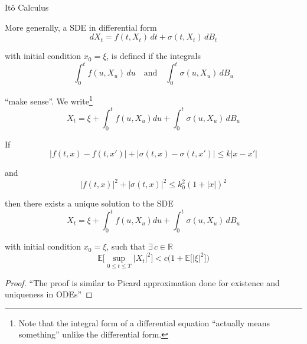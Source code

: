 \documentclass[12pt]{article}
\newenvironment{theorem}[2][Theorem:]{\begin{trivlist} %
\item[\hskip \labelsep {\bfseries #1}\hskip \labelsep {\bfseries #2.}]}{\end{trivlist}}
\begin{document}
\begin{section}{It\^{o} Calculus}
\begin{theorem}{Existence}
More generally, a SDE in differential form
\begin{equation*}
	dX_t = f(t,X_t)\,dt + \sigma(t,X_t)\,dB_t
\end{equation*}

with initial condition $x_0 = \xi$, is defined if the integrals
\begin{equation*}
	\int^t_0f(u,X_u)\,du \quad \text{and} \quad \int^t_0 \sigma(u,X_u)\,dB_u
\end{equation*}

``make sense''. We write\footnote{Note that the integral form of a differential equation ``actually means something'' unlike the differential form.}
\begin{equation*}
	X_t = \xi + \int^t_0f(u,X_u)du + \int^t_0\sigma(u,X_u)\,dB_u
\end{equation*}
\end{theorem}

\begin{theorem}{Uniqueness} If 
\begin{equation*}
	|f(t,x) - f(t,x')| + |\sigma(t,x) - \sigma(t,x')| \leq k|x-x'|
\end{equation*}

and
\begin{equation*}
	|f(t,x)|^2 + |\sigma(t,x)|^2 \leq k^2_0(1 + |x|)^2
\end{equation*}

then there exists a unique solution to the SDE
\begin{equation*}
	X_t = \xi + \int^t_0f(u,X_u)du + \int^t_0\sigma(u,X_u)\,dB_u
\end{equation*}

with initial condition $x_0 = \xi$, such that $\exists\,c\in\mathbb R$
\begin{equation*}
	\mathbb E\big[\sup_{0\leq t\leq T} |X_t|^2\big] < c\Big(1 + \mathbb E\big[|\xi|^2\big]\Big)
\end{equation*}

\begin{proof} ``The proof is similar to Picard approximation done for existence and uniqueness in ODEs''
\end{proof}
\end{theorem}





\end{section}
\end{document}
